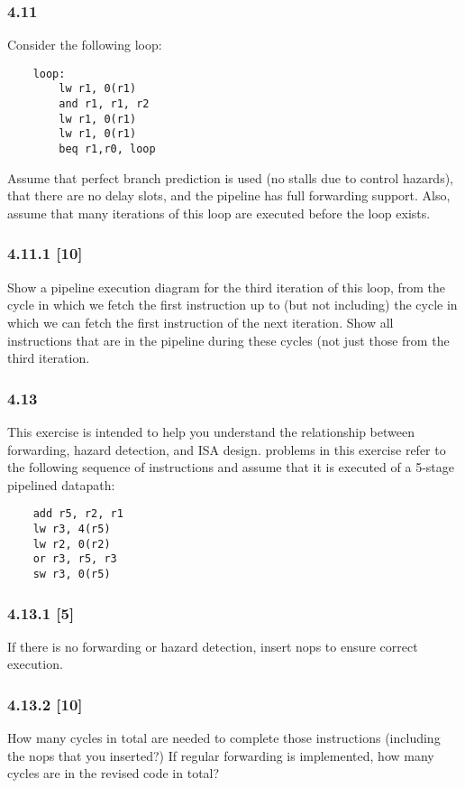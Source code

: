 \documentclass[fleqn]{article}
\begin{document}
\subsubsection*{4.11} Consider the following loop:
\begin{lstlisting}
    loop:
        lw r1, 0(r1)
        and r1, r1, r2
        lw r1, 0(r1)
        lw r1, 0(r1)
        beq r1,r0, loop
\end{lstlisting}
Assume that perfect branch prediction is used (no stalls due to control hazards), that there are no delay slots,
and the pipeline has full forwarding support. Also, assume that many iterations of this loop are executed
before the loop exists.

\subsubsection*{4.11.1 [10] \textrangle} Show a pipeline execution diagram for the third iteration of this loop, from the cycle in which we
fetch the first instruction up to (but not including) the cycle in which we can fetch the first instruction of
the next iteration. Show all instructions that are in the pipeline during these cycles (not just those from the
third iteration.
\vspace{0.125in}

\subsubsection*{4.13} This exercise is intended to help you understand the relationship between forwarding, hazard detection,
and ISA design. problems in this exercise refer to the following sequence of instructions and assume that it
is executed of a 5-stage pipelined datapath:
\begin{lstlisting}
    add r5, r2, r1
    lw r3, 4(r5)
    lw r2, 0(r2)
    or r3, r5, r3
    sw r3, 0(r5)
\end{lstlisting}


\subsubsection*{4.13.1 [5] \textrangle} If there is no forwarding or hazard detection, insert nops to ensure correct execution.

\subsubsection*{4.13.2 [10] \textrangle} How many cycles in total are needed to complete those instructions (including the nops that you
inserted?) If regular forwarding is implemented, how many cycles are in the revised code in total?
\vspace{0.125in}
\end{document}

